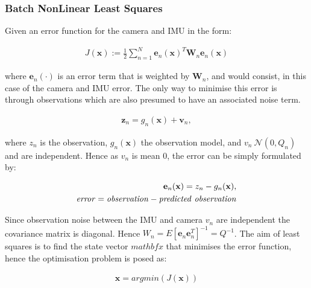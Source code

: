 \documentclass[a4paper,11pt,notitlepage]{article}
\begin{document}
\subsubsection{Batch NonLinear Least Squares}

Given an error function for the camera and IMU in the form:

\begin{equation}
\begin{aligned}
J(\mathbf{x}) := \frac{1}{2} \sum_{n=1}^{N} \textbf{e}_{n} (\textbf{x})^{T} \textbf{W}_{n} \textbf{e}_{n}(\textbf{x}) 
\end{aligned}
\end{equation} 

where $\textbf{e}_{n}(\cdot)$ is an error term that is weighted by $\textbf{W}_{n}$, and would consist, in this case of the camera and IMU error. The only way to minimise this error is through observations which are also presumed to have an associated noise term.

\begin{equation}
\begin{aligned}
\textbf{z}_{n} = g_{n}(\textbf{x}) + \textbf{v}_{n},
\end{aligned}
\end{equation} 

where $z_{n}$ is the observation, $g_{n}(\textbf{x})$ the observation model, and $v_{n} ~ \mathcal{N}(0,Q_{n})$ and are independent. Hence as $v_{n}$ is mean 0, the error can be simply formulated by:

\begin{equation}
\begin{aligned}
\textbf{e}_{n}(\textbf{x}) = z_{n} - g_{n}(\textbf{x}), \\
\mathit{error = observation - predicted \textnormal{ } observation}
\end{aligned}
\end{equation}

Since observation noise between the IMU and camera $v_{n}$ are independent the covariance matrix is diagonal. Hence $W_{n} = E[\mathbf{e}_{n} \mathbf{e}_{n}^{T}]^{-1} = Q^{-1}$. The aim of least squares is to find the state vector $mathbf{x}$ that minimises the error function, hence the optimisation problem is posed as:

\begin{equation}
\begin{aligned}
\textbf{x} = argmin(J(\mathbf{x}))
\end{aligned}
\end{equation}
\end{document}
